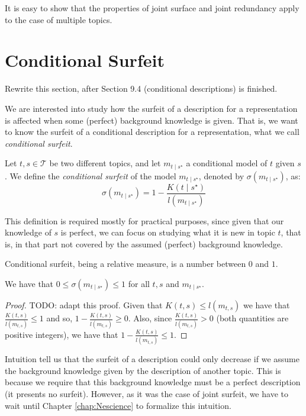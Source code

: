 It is easy to show that the properties of joint surface and joint redundancy apply to the case of multiple topics.

%
%

\section{Conditional Surfeit}

{\color{red} Rewrite this section, after Section 9.4 (conditional descriptions) is finished.}

We are interested into study how the surfeit of a description for a representation is affected when some (perfect) background knowledge is given. That is, we want to know the surfeit of a conditional description for a representation, what we call \emph{conditional surfeit}.

\begin{definition}
Let $t,s \in \mathcal{T}$ be two different topics, and let $m_{t \mid s^\star}$ a conditional model of $t$ given $s$. We define the \emph{conditional surfeit} of the model $m_{t \mid s^\star}$, denoted by $\sigma(m_{t \mid s^\star})$, as: 
\[
\sigma(m_{t \mid s^\star}) = 1 - \frac{K\left( t \mid s^\star \right)}{l \left( m_{t \mid s^\star} \right)}
\]
\end{definition}

This definition is required mostly for practical purposes, since given that our knowledge of $s$ is perfect, we can focus on studying what it is new in topic $t$, that is, in that part not covered by the assumed (perfect) background knowledge.

Conditional surfeit, being a relative measure, is a number between $0$ and $1$.

\begin{proposition}
We have that $0 \leq \sigma(m_{t \mid s^\star}) \leq 1$ for all $t,s$ and $m_{t \mid s^\star}$.
\end{proposition}
\begin{proof}
{\color{red} TODO: adapt this proof.}
Given that $K(t,s) \leq l(m_{t,s})$ we have that $\frac{K(t, s)}{l \left( m_{t,s} \right)} \leq 1$ and so, $1 - \frac{K(t, s)}{l \left( m_{t,s} \right)} \geq 0$. Also, since $\frac{K(t, s)}{l \left( m_{t,s} \right)} > 0$ (both quantities are positive integers), we have that $1 - \frac{K(t, s)}{l \left( m_{t,s} \right)} \leq 1$.
\end{proof}

Intuition tell us that the surfeit of a description could only decrease if we assume the background knowledge given by the description of another topic. This is because we require that this background knowledge must be a perfect description (it presents no surfeit). However, as it was the case of joint surfeit, we have to wait until Chapter \ref{chap:Nescience} to formalize this intuition.

